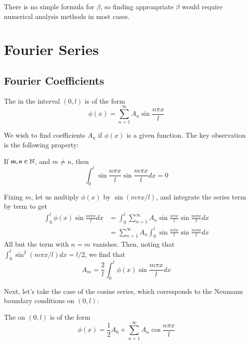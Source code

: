 \documentclass[12pt, a4paper, oneside, openright, titlepage]{book}
\begin{document}
There is no simple formula for $\beta$, so finding approapriate $\beta$ would require numerical analysis methods in most cases.




\chapter{Fourier Series}

\section{Fourier Coefficients}

\begin{defn}
    The  in the interval $(0,l)$ is of the form \begin{equation}
        \phi(x) = \sum_{n=1}^{\infty}A_n\sin\frac{n\pi x}{l}
    \end{equation}
\end{defn}

We wish to find coefficients $A_n$ if $\phi(x)$ is a given function. The key observation is the following property: 

\begin{prop}
    If $m,n \in \mathbb N$, and $m \neq n$, then \begin{equation*}
        \int_0^l\sin\frac{n\pi x}{l}\sin\frac{m\pi x}{l}dx = 0
    \end{equation*}
\end{prop}

Fixing $m$, let us multiply $\phi(x)$ by $\sin(m\pi x/l)$, and integrate the series term by term to get \begin{align*}
    \int_0^l\phi(x)\sin\frac{m\pi x}{l}dx &= \int_0^l\sum_{n=1}^{\infty}A_n\sin\frac{n\pi x}{l}\sin\frac{m\pi x}{l}dx \\
    &= \sum_{n=1}^{\infty}A_n\int_0^l\sin\frac{n\pi x}{l}\sin\frac{m\pi x}{l}dx 
\end{align*}
All but the term with $n = m$ vanishes. Then, noting that $\int_0^l\sin^2(m\pi x/l)dx = l/2$, we find that \begin{equation}
    \boxed{A_m = \frac{2}{l}\int_0^l\phi(x)\sin\frac{m\pi x}{l}dx}
\end{equation}


Next, let's take the case of the cosine series, which corresponds to the Neumann boundary conditions on $(0,l)$: 

\begin{defn}
    The  on $(0,l)$ is of the form \begin{equation}
        \phi(x) = \frac{1}{2}A_0+\sum_{n=1}^{\infty}A_n\cos\frac{n\pi x}{l}
    \end{equation}
\end{defn}
\end{document}
